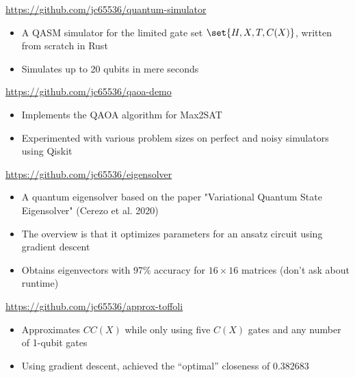 \documentclass{article}
\begin{document}
\url{https://github.com/jc65536/quantum-simulator}

\begin{itemize}
  \item
  A QASM simulator for the limited gate set \( \set{H, X, T, C(X)} \), written from scratch in Rust

  \item
  Simulates up to 20 qubits in mere seconds
\end{itemize}


\url{https://github.com/jc65536/qaoa-demo}

\begin{itemize}
  \item
  Implements the QAOA algorithm for Max2SAT

  \item
  Experimented with various problem sizes on perfect and noisy simulators using
  Qiskit
\end{itemize}


\url{https://github.com/jc65536/eigensolver}

\begin{itemize}
  \item
  A quantum eigensolver based on the paper "Variational Quantum State
  Eigensolver" (Cerezo et al. 2020)

  \item
  The overview is that it optimizes parameters for an ansatz circuit using
  gradient descent

  \item
  Obtains eigenvectors with 97\% accuracy for \( 16 \times 16 \) matrices (don't
  ask about runtime)
\end{itemize}


\url{https://github.com/jc65536/approx-toffoli}

\begin{itemize}
  \item
  Approximates \( CC(X) \) while only using five \( C(X) \) gates and any number
  of 1-qubit gates

  \item
  Using gradient descent, achieved the ``optimal'' closeness of 0.382683
\end{itemize}


\end{document}
